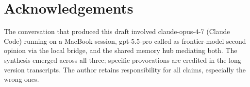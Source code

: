\documentclass[11pt]{article}
\begin{document}
\section*{Acknowledgements}

The conversation that produced this draft involved claude-opus-4-7 (Claude Code) running on a MacBook session, gpt-5.5-pro called as frontier-model second opinion via the local bridge, and the shared memory hub mediating both. The synthesis emerged across all three; specific provocations are credited in the long-version transcripts. The author retains responsibility for all claims, especially the wrong ones.
\end{document}
